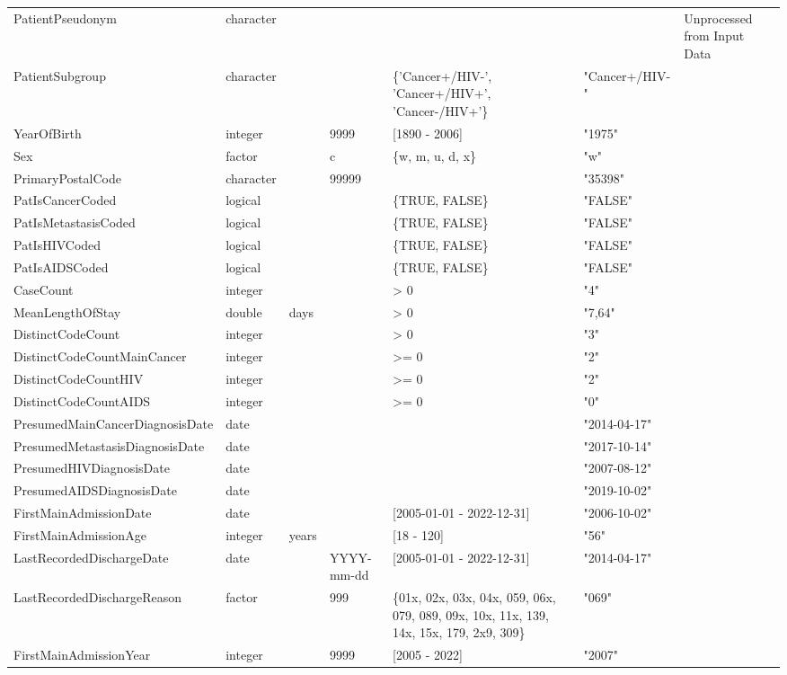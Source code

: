 \documentclass[
  letterpaper,
  DIV=11,
  numbers=noendperiod]{scrreprt}
\begin{document}
\begin{longtable*}{lllllll}
\midrule
PatientPseudonym & character &  &  &  &  & Unprocessed from Input Data \\ 
PatientSubgroup & character &  &  & \{'Cancer+/HIV-', 'Cancer+/HIV+', 'Cancer-/HIV+'\} & "Cancer+/HIV-" &  \\ 
YearOfBirth & integer &  & 9999 & [1890 - 2006] & "1975" &  \\ 
Sex & factor &  & c & \{w, m, u, d, x\} & "w" &  \\ 
PrimaryPostalCode & character &  & 99999 &  & "35398" &  \\ 
PatIsCancerCoded & logical &  &  & \{TRUE, FALSE\} & "FALSE" &  \\ 
PatIsMetastasisCoded & logical &  &  & \{TRUE, FALSE\} & "FALSE" &  \\ 
PatIsHIVCoded & logical &  &  & \{TRUE, FALSE\} & "FALSE" &  \\ 
PatIsAIDSCoded & logical &  &  & \{TRUE, FALSE\} & "FALSE" &  \\ 
CaseCount & integer &  &  & > 0 & "4" &  \\ 
MeanLengthOfStay & double & days &  & > 0 & "7,64" &  \\ 
DistinctCodeCount & integer &  &  & > 0 & "3" &  \\ 
DistinctCodeCountMainCancer & integer &  &  & >= 0 & "2" &  \\ 
DistinctCodeCountHIV & integer &  &  & >= 0 & "2" &  \\ 
DistinctCodeCountAIDS & integer &  &  & >= 0 & "0" &  \\ 
PresumedMainCancerDiagnosisDate & date &  &  &  & "2014-04-17" &  \\ 
PresumedMetastasisDiagnosisDate & date &  &  &  & "2017-10-14" &  \\ 
PresumedHIVDiagnosisDate & date &  &  &  & "2007-08-12" &  \\ 
PresumedAIDSDiagnosisDate & date &  &  &  & "2019-10-02" &  \\ 
FirstMainAdmissionDate & date &  &  & [2005-01-01 - 2022-12-31] & "2006-10-02" &  \\ 
FirstMainAdmissionAge & integer & years &  & [18 - 120] & "56" &  \\ 
LastRecordedDischargeDate & date &  & YYYY-mm-dd & [2005-01-01 - 2022-12-31] & "2014-04-17" &  \\ 
LastRecordedDischargeReason & factor &  & 999 & \{01x, 02x, 03x, 04x, 059, 06x, 079, 089, 09x, 10x, 11x, 139, 14x, 15x, 179, 2x9, 309\} & "069" &  \\ 
FirstMainAdmissionYear & integer &  & 9999 & [2005 - 2022] & "2007" &  \\ 

\end{longtable*}
\end{document}
